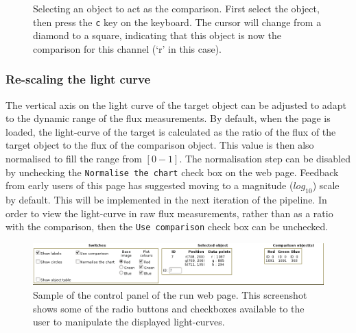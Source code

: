 \begin{figure}
  \centering
  \setlength{\fboxrule}{1pt}

  \caption{Selecting an object to act as the comparison. First select the object, then press the \texttt{c} key on the keyboard. The cursor will change from a diamond to a square, indicating that this object is now the comparison for this channel (`r' in this case).}
  \label{fig:selectcomparison}
\end{figure}  

\subsubsection{Re-scaling the light curve}
The vertical axis on the light curve of the target object can be adjusted to adapt to the dynamic range of the flux measurements. By default, when the page is loaded, the light-curve of the target is calculated as the ratio of the flux of the target object to the flux of the comparison object. This value is then also normalised to fill the range from $[0 - 1]$. The normalisation step can be disabled by unchecking the \texttt{Normalise the chart} check box on the web page. Feedback from early users of this page has suggested moving to a magnitude ($log_{10}$) scale by default. This will be implemented in the next iteration of the pipeline. In order to view the light-curve in raw flux measurements, rather than as a ratio with the comparison, then the \texttt{Use comparison} check box can be unchecked.

\begin{figure}
  \centering
  \includegraphics[width=140mm]{images/webcontrols.png}
  \caption{Sample of the control panel of the run web page. This screenshot shows some of the radio buttons and checkboxes available to the user to manipulate the displayed light-curves. }
  \label{fig:webcontrols}
\end{figure}  


